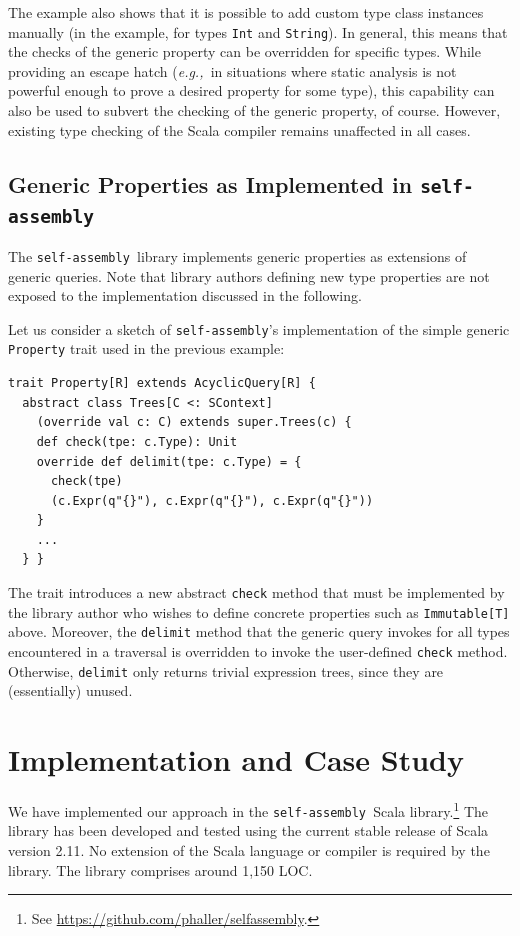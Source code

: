 \documentclass[preprint,nocopyrightspace]{sigplanconf}
\newcommand{\eg}{{\em e.g.,~}}
\newcommand{\selfassembly}{\texttt{self-assembly~}}
\begin{document}
The example also shows that it is possible to add custom type class instances
manually (in the example, for types \verb|Int| and \verb|String|). In general,
this means that the checks of the generic property can be overridden for
specific types. While providing an escape hatch (\eg in situations where
static analysis is not powerful enough to prove a desired property for
some type), this capability can also be used to subvert the checking of the
generic property, of course. However, existing type checking of the Scala
compiler remains unaffected in all cases.


\subsection{Generic Properties as Implemented in \selfassembly}
\label{sec:genprop-implementation}

The \selfassembly library implements generic properties as extensions of
generic queries. Note that library authors defining new type properties are
not exposed to the implementation discussed in the following.

Let us consider a sketch of \texttt{self-assembly}'s implementation of the simple generic
\verb|Property| trait used in the previous example:
\begin{lstlisting}
trait Property[R] extends AcyclicQuery[R] {
  abstract class Trees[C <: SContext]
    (override val c: C) extends super.Trees(c) {
    def check(tpe: c.Type): Unit
    override def delimit(tpe: c.Type) = {
      check(tpe)
      (c.Expr(q"{}"), c.Expr(q"{}"), c.Expr(q"{}"))
    }
    ...
  } }
\end{lstlisting}
\noindent
The trait introduces a new abstract \verb|check| method that must be
implemented by the library author who wishes to define concrete properties
such as \verb|Immutable[T]| above. Moreover, the \verb|delimit| method that the
generic query invokes for all types encountered in a traversal is overridden
to invoke the user-defined \verb|check| method. Otherwise, \verb|delimit| only
returns trivial expression trees, since they are (essentially) unused.


\section{Implementation and Case Study}

We have implemented our approach in the \selfassembly Scala
library.\footnote{See \url{https://github.com/phaller/selfassembly}.} The
library has been developed and tested using the current stable release of
Scala version 2.11. No extension of the Scala language or compiler is required
by the library. The library comprises around 1,150 LOC.
\end{document}
